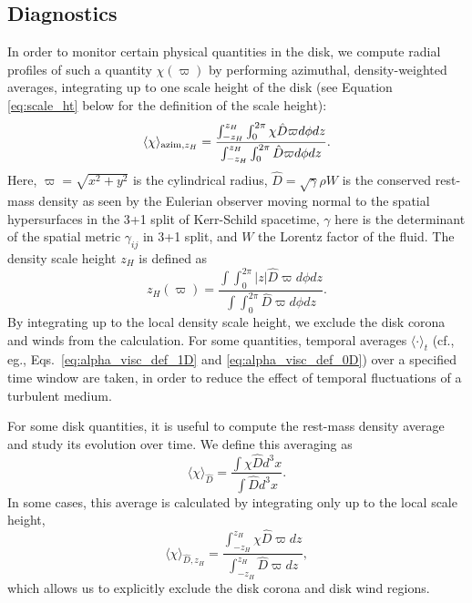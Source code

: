 \subsection{Diagnostics}\label{subsec:diagnostics}

In order to monitor certain physical quantities in the disk, we compute radial profiles of such a quantity $\chi(\varpi)$ by performing azimuthal, density-weighted averages, integrating up to one scale height of the disk (see Equation \ref{eq:scale_ht} below for the definition of the scale height):
\begin{equation}\label{eq:radial_av}
    \langle \chi \rangle_{{\rm azim}, z_H} = \frac{\int^{z_H}_{-z_H} \int_0^{2\pi} \chi \hat D \varpi d\phi dz}{\int^{z_H}_{-z_H} \int_0^{2\pi} \hat D \varpi d\phi dz}.
\end{equation}
Here, $\varpi = \sqrt{x^2 + y^2}$ is the cylindrical radius, $\hat D = \sqrt{\gamma} \rho W$ is the conserved rest-mass density as seen by the Eulerian observer moving normal to the spatial hypersurfaces in the 3+1 split of Kerr-Schild spacetime, $\gamma$ here is the determinant of the spatial metric $\gamma_{ij}$ in 3+1 split, and $W$ the Lorentz factor of the fluid. The density scale height $z_H$ is defined as
\begin{equation}\label{eq:scale_ht}
    z_H (\varpi) = \frac{\int \int_0^{2\pi} |z| \hat D \varpi d\phi dz}{\int \int_0^{2\pi}\hat D \varpi d\phi dz}.
\end{equation}
By integrating up to the local density scale height, we exclude the disk corona and winds from the calculation. For some quantities, temporal averages $\langle\cdot\rangle_t$ (cf., eg., Eqs.~\eqref{eq:alpha_visc_def_1D} and \eqref{eq:alpha_visc_def_0D}) over a specified time window are taken, in order to reduce the effect of temporal fluctuations of a turbulent medium.

For some disk quantities, it is useful to compute the rest-mass density average and study its evolution over time. We define this averaging as
\begin{equation}\label{eq:rest_mass_dens}
 \langle \chi \rangle_{\hat D} = \frac{\int \chi \hat D d^3x}{\int \hat D d^3x}.
\end{equation}
In some cases, this average is calculated by integrating only up to the local scale height,
\begin{equation}\label{eq:rest_mass_dens_scaleht}
    \langle \chi \rangle_{\hat D, z_H} = \frac{\int^{z_H}_{-z_H} \chi \hat D \varpi dz}{\int^{z_H}_{-z_H} \hat D \varpi dz},
\end{equation}
which allows us to explicitly exclude the disk corona and disk wind regions.


